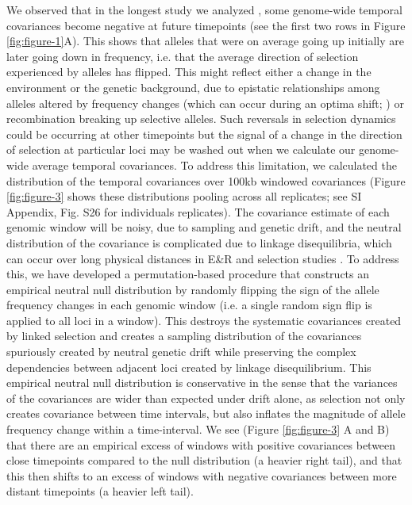 \documentclass[9pt,twocolumn,twoside]{pnas-new}
\begin{document}
We observed that in the longest study  we analyzed \cite{Barghi2019-qy}, some
genome-wide temporal covariances become negative at future timepoints (see the
first two rows in Figure \ref{fig:figure-1}A). This shows that alleles that
were on average going up initially are later going down in frequency, i.e.
that the average direction of selection experienced by alleles has flipped.
This might reflect either a change in the environment or the genetic
background, due to epistatic relationships among alleles altered by frequency
changes (which can occur during an optima shift; \cite{Hayward2019-kt}) or
recombination breaking up selective alleles. Such reversals in selection
dynamics could be occurring at other timepoints but the signal of a change in
the direction of selection at particular loci may be washed out when we
calculate our genome-wide average temporal covariances.  To address this
limitation, we calculated the distribution of the temporal covariances over
100kb windowed covariances (Figure \ref{fig:figure-3} shows these distributions
pooling across all replicates; see SI Appendix, Fig. S26 for individuals
replicates). The covariance estimate of each genomic window will be noisy, due
to sampling and genetic drift, and the neutral distribution of the covariance
is complicated due to linkage disequilibria, which can occur over long physical
distances in E\&R and selection studies
\cite{Nuzhdin2013-gf,Baldwin-Brown2014-cl}.  To address this, we have developed
a permutation-based procedure that constructs an empirical neutral null
distribution by randomly flipping the sign of the allele frequency changes in
each genomic window (i.e. a single random sign flip is applied to all loci in a
window). This destroys the systematic covariances created by linked selection
and creates a sampling distribution of the covariances spuriously created by
neutral genetic drift while preserving the complex dependencies between
adjacent loci created by linkage disequilibrium.  This empirical neutral null
distribution is conservative in the sense that the variances of the covariances
are wider than expected under drift alone, as selection not only creates
covariance between time intervals, but also inflates the magnitude of allele
frequency change within a time-interval.  We see (Figure \ref{fig:figure-3} A
and B) that there are an empirical excess of windows with positive covariances
between close timepoints compared to the null distribution (a heavier right
tail), and that this then shifts to an excess of windows with negative
covariances between more distant timepoints (a heavier left tail).
\end{document}
